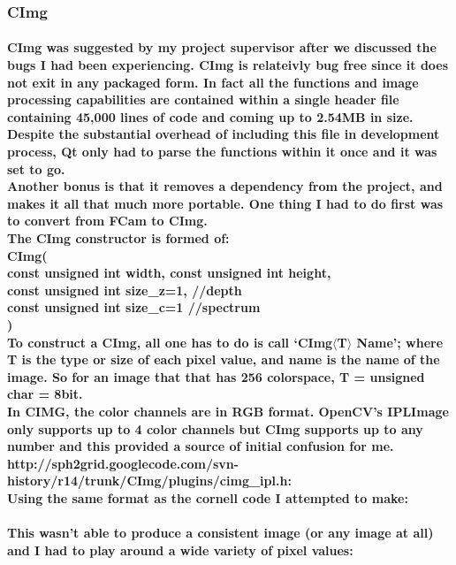 \subsubsection{CImg}
\paragraph{CImg was suggested by my project supervisor after we discussed the bugs I had been experiencing. CImg is relateivly bug free since it does not exit in any packaged form. In fact all the functions and image processing capabilities are contained within a single header file containing 45,000 lines of code and coming up to 2.54MB in size. \\Despite the substantial overhead of including this file in development process, Qt only had to parse the functions within it once and it was set to go.
\\Another bonus is that it removes a dependency from the project, and makes it all that much more portable. One thing I had to do first was to convert from FCam to CImg.
\\The CImg constructor is formed of:\\
\tab CImg(\\
\tab\tab const unsigned int width, const unsigned int height,\\
\tab\tab const unsigned int size\_z=1, //depth\\
\tab\tab const unsigned int size\_c=1 //spectrum\\
)\\
To construct a CImg, all one has to do is call ‘CImg\(\langle\)T\(\rangle\) Name’; where T is the type or size of each pixel value, and name is the name of the image. So for an image that that has 256 colorspace, T = unsigned char = 8bit.
\\In CIMG, the color channels are in RGB format. OpenCV's IPLImage only supports up to 4 color channels but CImg supports up to any number and this provided a source of initial confusion for me.
http://sph2grid.googlecode.com/svn-history/r14/trunk/CImg/plugins/cimg\_ipl.h:\\
Using the same format as the cornell code I attempted to make:}
\begin{frame}[fragile]

\end{frame}
\paragraph{This wasn't able to produce a consistent image (or any image at all) and I had to play around a wide variety of pixel values:}
\begin{frame}[fragile]

\end{frame}
